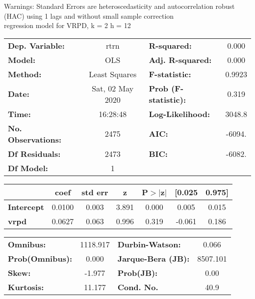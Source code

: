 Warnings: \newline
 [1] Standard Errors are heteroscedasticity and autocorrelation robust (HAC) using 1 lags and without small sample correction\\ 

regression model for VRPD, k = 2 h = 12\begin{center}
\begin{tabular}{lclc}
\toprule
\textbf{Dep. Variable:}    &       rtrn       & \textbf{  R-squared:         } &     0.000   \\
\textbf{Model:}            &       OLS        & \textbf{  Adj. R-squared:    } &     0.000   \\
\textbf{Method:}           &  Least Squares   & \textbf{  F-statistic:       } &    0.9923   \\
\textbf{Date:}             & Sat, 02 May 2020 & \textbf{  Prob (F-statistic):} &    0.319    \\
\textbf{Time:}             &     16:28:48     & \textbf{  Log-Likelihood:    } &    3048.8   \\
\textbf{No. Observations:} &        2475      & \textbf{  AIC:               } &    -6094.   \\
\textbf{Df Residuals:}     &        2473      & \textbf{  BIC:               } &    -6082.   \\
\textbf{Df Model:}         &           1      & \textbf{                     } &             \\
\bottomrule
\end{tabular}
\begin{tabular}{lcccccc}
                   & \textbf{coef} & \textbf{std err} & \textbf{z} & \textbf{P$> |$z$|$} & \textbf{[0.025} & \textbf{0.975]}  \\
\midrule
\textbf{Intercept} &       0.0100  &        0.003     &     3.891  &         0.000        &        0.005    &        0.015     \\
\textbf{vrpd}      &       0.0627  &        0.063     &     0.996  &         0.319        &       -0.061    &        0.186     \\
\bottomrule
\end{tabular}
\begin{tabular}{lclc}
\textbf{Omnibus:}       & 1118.917 & \textbf{  Durbin-Watson:     } &    0.066  \\
\textbf{Prob(Omnibus):} &   0.000  & \textbf{  Jarque-Bera (JB):  } & 8507.101  \\
\textbf{Skew:}          &  -1.977  & \textbf{  Prob(JB):          } &     0.00  \\
\textbf{Kurtosis:}      &  11.177  & \textbf{  Cond. No.          } &     40.9  \\
\bottomrule
\end{tabular}
\end{center}

